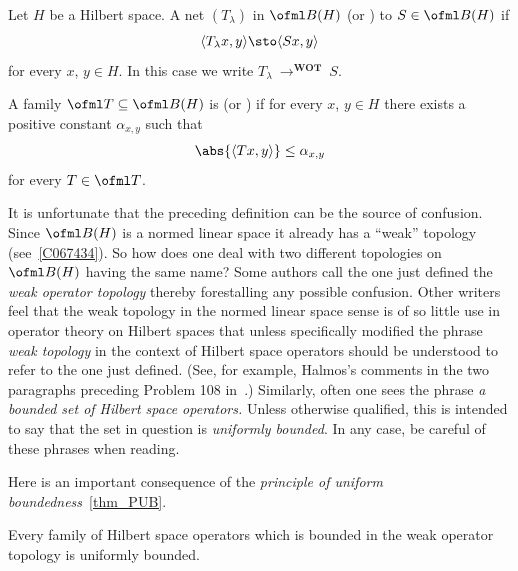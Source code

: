 \begin{defn} Let $H$ be a Hilbert space.  A net $(T_\lambda)$ in $\ofml B(H)$
 (or ) to $S \in \ofml B(H)$ if
  \[ \langle T_\lambda x,y \rangle \sto \langle Sx,y \rangle \]
for every $x$, $y \in H$.  In this case we write
$T_\lambda~\to^{\textbf{WOT}}~S$.

A family $\ofml T \subseteq \ofml B(H)$ is
 (or ) if for every $x$, $y \in H$
there exists a positive constant $\alpha_{x,y}$ such that
  \[\abs{\langle Tx,y \rangle} \le \alpha_{x,y}\]
for every $T \in \ofml T$.
\end{defn}

It is unfortunate that the preceding definition can be the source of confusion.  Since $\ofml B(H)$ is a
normed linear space it already has a ``weak'' topology (see~\ref{C067434}).  So how does one deal with two
different topologies on $\ofml B(H)$ having the same name?  Some authors call the one just defined the
\emph{weak operator topology} thereby forestalling any possible confusion.  Other writers feel that the
weak topology in the normed linear space sense is of so little use in operator theory on Hilbert spaces
that unless specifically modified the phrase \emph{weak topology} in the context of Hilbert space operators
should be understood to refer to the one just defined. (See, for example, Halmos's comments in the two
paragraphs preceding Problem 108 in~\cite{Halmos:1982}.)  Similarly, often one sees the phrase \emph{a
bounded set of Hilbert space operators.}  Unless otherwise qualified, this is intended to say that the set
in question is \emph{uniformly bounded}.  In any case, be careful of these phrases when reading.

Here is an important consequence of the \emph{principle of uniform boundedness}~\ref{thm_PUB}.

\begin{prop} Every family of Hilbert space operators which is bounded in the weak operator
topology is uniformly bounded.
\end{prop}

